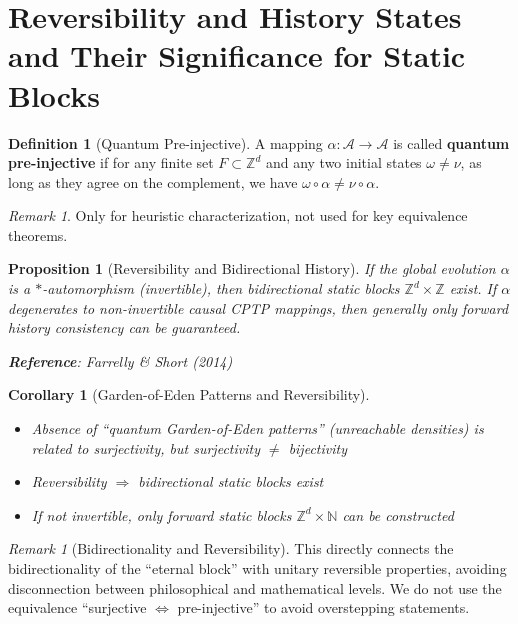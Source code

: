 \documentclass[11pt]{article}
\newtheorem{proposition}[theorem]{Proposition}
\newtheorem{corollary}[theorem]{Corollary}
\theoremstyle{definition}
\newtheorem{definition}[theorem]{Definition}
\theoremstyle{remark}
\newtheorem{remark}[theorem]{Remark}
\begin{document}
\section{Reversibility and History States and Their Significance for Static Blocks}\label{sec:reversibility}

\begin{definition}[Quantum Pre-injective]\label{def:qpreinj}
A mapping \( \alpha: \mathcal{A} \to \mathcal{A} \) is called \textbf{quantum pre-injective} if for any finite set \( F \subset \mathbb{Z}^d \) and any two initial states \( \omega \neq \nu \), as long as they agree on the complement, we have \( \omega \circ \alpha \neq \nu \circ \alpha \).
\end{definition}

\begin{remark}
Only for heuristic characterization, not used for key equivalence theorems.
\end{remark}

\begin{proposition}[Reversibility and Bidirectional History]\label{prop:qreversibility}
If the global evolution \( \alpha \) is a \( * \)-automorphism (invertible), then bidirectional static blocks \( \mathbb{Z}^d \times \mathbb{Z} \) exist. If \( \alpha \) degenerates to non-invertible causal CPTP mappings, then generally only forward history consistency can be guaranteed.

\textbf{Reference}: Farrelly \& Short (2014)
\end{proposition}

\begin{corollary}[Garden-of-Eden Patterns and Reversibility]\label{cor:qgarden}
\begin{itemize}
\item Absence of ``quantum Garden-of-Eden patterns'' (unreachable densities) is related to surjectivity, but surjectivity \( \neq \) bijectivity
\item Reversibility \( \Rightarrow \) bidirectional static blocks exist
\item If not invertible, only forward static blocks \( \mathbb{Z}^d \times \mathbb{N} \) can be constructed
\end{itemize}
\end{corollary}

\begin{remark}[Bidirectionality and Reversibility]
This directly connects the bidirectionality of the ``eternal block'' with unitary reversible properties, avoiding disconnection between philosophical and mathematical levels. We do not use the equivalence ``surjective \( \Leftrightarrow \) pre-injective'' to avoid overstepping statements.
\end{remark}
\end{document}
